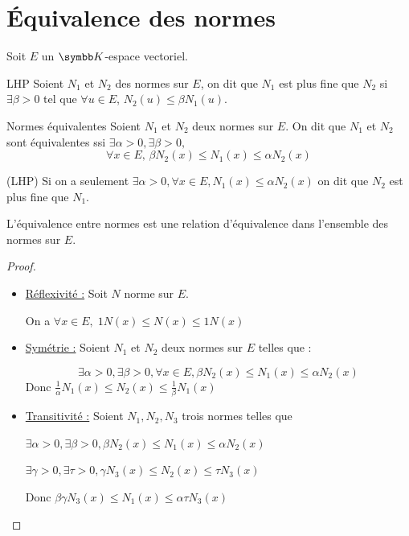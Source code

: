\section{Équivalence des normes}

Soit $E$ un $\K$-espace vectoriel. 

\begin{definition}{LHP}{}
    Soient $N_1$ et $N_2$ des normes sur $E$, on dit que $N_1$ est plus fine que $N_2$ si $\exists \beta > 0$ tel que $\forall u \in E$, $N_2(u) \leqslant \beta N_1(u)$.    
\end{definition}

\begin{definition}{Normes équivalentes}{}
    Soient $N_1$ et $N_2$ deux normes sur $E$. On dit que $N_1$ et $N_2$ sont équivalentes ssi $ \exists \alpha > 0, \exists \beta > 0, $
    \[\forall x \in E, \, \beta N_2(x) \leqslant N_1(x) \leqslant \alpha N_2(x)\]
\end{definition}

\begin{remarque}
    (LHP) Si on a seulement $\exists \alpha > 0, \forall x \in E, N_1(x) \leqslant \alpha N_2(x)$
    on dit que $N_2$ est plus fine que $N_1$. 
\end{remarque}

\begin{proposition}{}{}
    L'équivalence entre normes est une relation d'équivalence dans l'ensemble des normes
    sur $E$. 
\end{proposition}

\begin{proof}~

    \begin{itemize}
        \item \uline{Réflexivité :}
        Soit $N $ norme sur $E$. 

        On a $\forall x \in E, \; 1 N(x) \leqslant N(x) \leqslant 1N(x)$

        \item \uline{Symétrie :}
        Soient $N_1$ et $N_2$ deux normes sur $E$ telles que : 

        \[\exists \alpha > 0, \exists \beta > 0, \forall x \in E, \beta N_2(x) \leqslant N_1(x) \leqslant \alpha N_2(x)\]
        Donc $\frac 1 \alpha N_1(x) \leqslant N_2(x) \leqslant \frac 1 \beta N_1(x)$

        \item \uline{Transitivité :}
        Soient $N_1, N_2, N_3$ trois normes telles que 

        $\exists \alpha > 0, \exists \beta >0 , \beta N_2(x) \leqslant N_1(x) \leqslant \alpha N_2(x)$

        $\exists \gamma > 0, \exists \tau > 0, \gamma N_3(x) \leqslant N_2(x) \leqslant \tau N_3(x)$

        Donc $\beta \gamma N_3(x) \leqslant N_1(x) \leqslant \alpha \tau N_3(x)$
    \end{itemize}
\end{proof}

